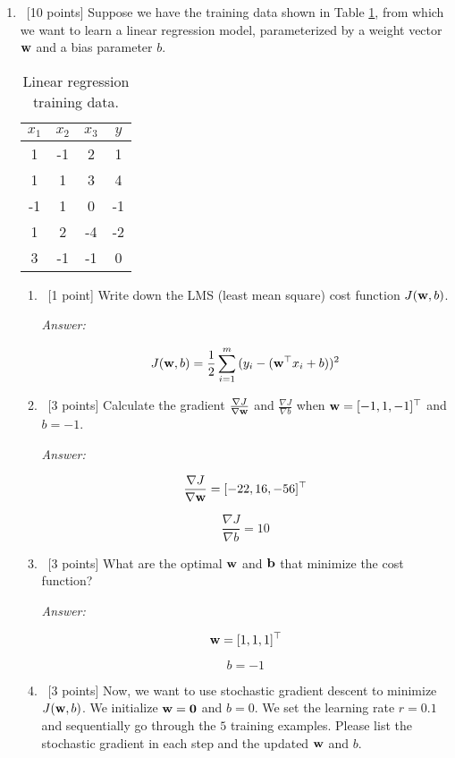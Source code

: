 \documentclass[12pt, fullpage,letterpaper]{article}
\begin{document}
\begin{enumerate}
\item~[10 points] Suppose we have the training data shown in Table \ref{tb:1}, from which we want to learn a linear regression model, parameterized by a weight vector ${\bf w}$ and a bias parameter $b$.  
\begin{table}
	\centering
	\begin{tabular}{ccc|c}
		$x_1 $ & $x_2$ & $x_3$ &  $y$\\ 
		\hline\hline
		1 & -1 & 2 & 1 \\ \hline
		1 & 1 & 3 & 4 \\ \hline
		-1 & 1 & 0 & -1 \\ \hline
		1 & 2 & -4 & -2 \\ \hline
		3 & -1 & -1 & 0\\ \hline
	\end{tabular}
	\caption{Linear regression training data.}\label{tb:1}
\end{table}

\begin{enumerate}
	\item~[1 point] Write down the LMS (least mean square) cost function $J({\bf w}, b)$. 

	\textit{Answer:}

	\[
		J({\bf w}, b) = \frac{1}{2} \sum_{i=1}^m{(y_i - ({\bf w}^\top x_i + b))^2}
	\]

	\item~[3 points] Calculate the gradient $\frac{\nabla J}{\nabla {\bf w}}$ and $\frac{\nabla J}{\nabla b}$ when ${\bf w} = [-1,1,-1]^\top$ and $b = -1$.

	\textit{Answer:}

	\[
		\frac{\nabla J}{\nabla {\bf w}} = [-22, 16, -56]^\top
	\]

	\[
		\frac{\nabla J}{\nabla b} = 10 
	\]

	\item~[3 points] What are the optimal ${\bf w}$ and ${\bf b}$ that minimize the cost function? 

	\textit{Answer:}

	\[
		{\bf w} = [1, 1, 1]^\top
	\]

	\[
		b = -1
	\]

	\item~[3 points] Now, we want to use stochastic gradient descent to minimize $J({\bf w}, b)$. We initialize ${\bf w} = {\bf 0}$ and $b = 0$. We set the learning rate $r = 0.1$ and sequentially go through the $5$ training examples. Please list the stochastic gradient in each step and the updated ${\bf w}$ and $b$.  


\end{enumerate}
\end{enumerate}
\end{document}
